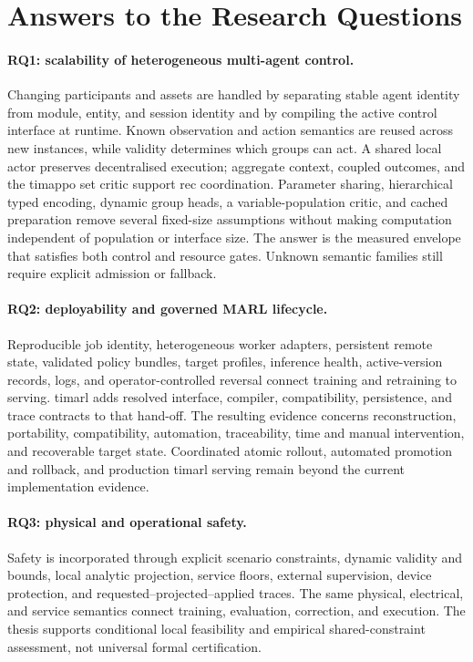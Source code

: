 \section{Answers to the Research Questions}
\label{sec:conclusion-rqs}

\paragraph{RQ1: scalability of heterogeneous multi-agent control.}
Changing participants and assets are handled by separating stable agent identity from module, entity, and session identity and by compiling the active control interface at runtime. Known observation and action semantics are reused across new instances, while validity determines which groups can act. A shared local actor preserves decentralised execution; aggregate context, coupled outcomes, and the \gls{timappo} set critic support \gls{rec} coordination. Parameter sharing, hierarchical typed encoding, dynamic group heads, a variable-population critic, and cached preparation remove several fixed-size assumptions without making computation independent of population or interface size. The answer is the measured envelope that satisfies both control and resource gates. Unknown semantic families still require explicit admission or fallback.

\paragraph{RQ2: deployability and governed MARL lifecycle.}
Reproducible job identity, heterogeneous worker adapters, persistent remote state, validated policy bundles, target profiles, inference health, active-version records, logs, and operator-controlled reversal connect training and retraining to serving. \gls{timarl} adds resolved interface, compiler, compatibility, persistence, and trace contracts to that hand-off. The resulting evidence concerns reconstruction, portability, compatibility, automation, traceability, time and manual intervention, and recoverable target state. Coordinated atomic rollout, automated promotion and rollback, and production \gls{timarl} serving remain beyond the current implementation evidence.

\paragraph{RQ3: physical and operational safety.}
Safety is incorporated through explicit scenario constraints, dynamic validity and bounds, local analytic projection, service floors, external supervision, device protection, and requested--projected--applied traces. The same physical, electrical, and service semantics connect training, evaluation, correction, and execution. The thesis supports conditional local feasibility and empirical shared-constraint assessment, not universal formal certification.

